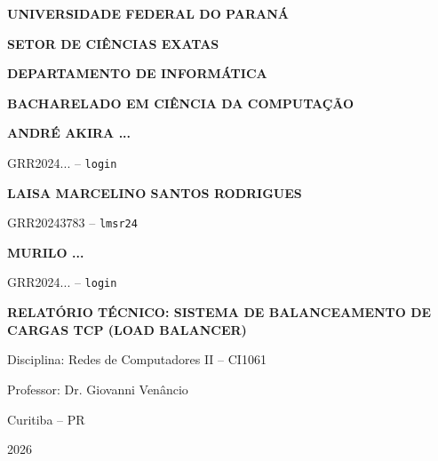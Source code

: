 \begin{titlepage}
    \thispagestyle{empty}

    \begin{center}
        {\bfseries UNIVERSIDADE FEDERAL DO PARANÁ\par}
        {\bfseries SETOR DE CIÊNCIAS EXATAS\par}
        {\bfseries DEPARTAMENTO DE INFORMÁTICA\par}
        {\bfseries BACHARELADO EM CIÊNCIA DA COMPUTAÇÃO\par}

        \vspace*{2.5cm}

        {\bfseries ANDRÉ AKIRA ...\par}
        GRR2024... -- \texttt{login}\par
        \vspace{0.4cm}
        {\bfseries LAISA MARCELINO SANTOS RODRIGUES\par}
        GRR20243783 -- \texttt{lmsr24}\par
        \vspace{0.4cm}
        {\bfseries MURILO ...\par}
        GRR2024... -- \texttt{login}\par

        \vspace*{4.0cm}

        {\bfseries\Large
        RELATÓRIO TÉCNICO: SISTEMA DE BALANCEAMENTO DE CARGAS TCP (LOAD BALANCER)\par}
        \vspace{0.5cm}
        {\large Disciplina: Redes de Computadores II -- CI1061\par}
        {\large Professor: Dr. Giovanni Venâncio\par}

        \vspace*{\fill}

        Curitiba -- PR\par
        2026
    \end{center}
\end{titlepage}
